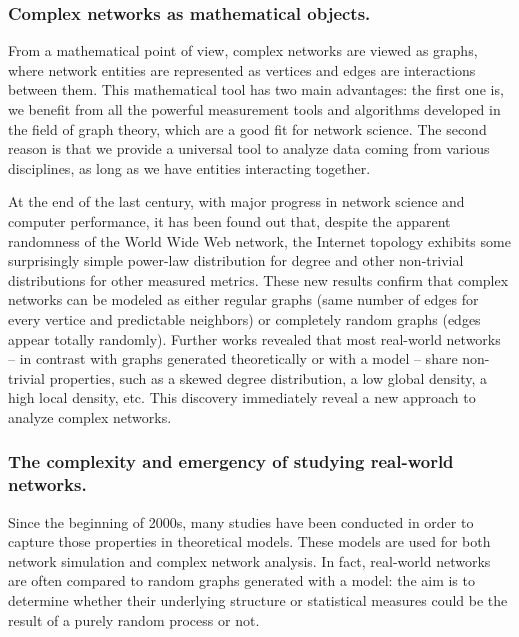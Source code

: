 \documentclass[table]{report}
\begin{document}
\subsubsection{Complex networks as mathematical objects.}
\bigbreak

From a mathematical point of view, complex networks are viewed as graphs, where network entities are represented as vertices and edges are interactions between them. This mathematical tool has two main advantages: the first one is, we benefit from all the powerful measurement tools and algorithms developed in the field of graph theory, which are a good fit for network science. The second reason is that we provide a universal tool to analyze data coming from various disciplines, as long as we have entities interacting together.


At the end of the last century, with major progress in network science and computer performance, it has been found out that, despite the apparent randomness of the World Wide Web network, the Internet topology exhibits some surprisingly simple power-law distribution for degree \cite{faloutsos} and other non-trivial distributions for other measured metrics. These new results confirm that complex networks can be modeled as either regular graphs (same number of edges for every vertice and predictable neighbors) or completely random graphs (edges appear totally randomly). Further works revealed that most real-world networks – in contrast with graphs generated theoretically or with a model – share non-trivial properties, such as a skewed degree distribution, a low global density, a high local density, etc. This discovery immediately reveal a new approach to analyze complex networks.

\medbreak

\subsubsection{The complexity and emergency of studying real-world networks.}
\medbreak

Since the beginning of 2000s, many studies have been conducted in order to capture those properties in theoretical models. These models are used for both network simulation and complex network analysis. In fact, real-world networks are often compared to random graphs generated with a model: the aim is to determine whether their underlying structure or statistical measures could be the result of a purely random process or not.
\end{document}
